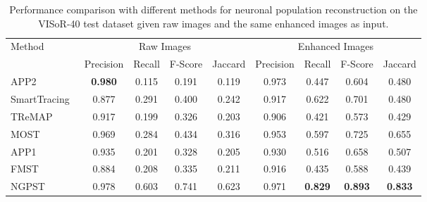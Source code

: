 \begin{table}[t]
	\centering
	\caption{Performance comparison with different methods for neuronal population reconstruction on the VISoR-40 test dataset given raw images and the same enhanced images as input.}
	\label{table:compare_VISoR}
	\begin{tabular}{lcccc|cccc}
		\hline
		\multirow{2}{*}{Method} & \multicolumn{4}{c|}{Raw Images}  & \multicolumn{4}{c}{Enhanced Images}\\ 
		\cline{2-5} \cline{6-9}
		& Precision & Recall & F-Score & Jaccard & Precision & Recall & F-Score & Jaccard\\ 
		\hline
		\multicolumn{1}{l}{APP2~\cite{Xiao2013}} & \textbf{0.980} & 0.115 & 0.191 & 0.119 & 0.973 & 0.447 & 0.604 & 0.480\\
		\multicolumn{1}{l}{SmartTracing~\cite{Chen2015}} & 0.877 & 0.291 & 0.400 & 0.242 & 0.917 & 0.622 & 0.701 & 0.480\\
		\multicolumn{1}{l}{TReMAP~\cite{Zhou2016}} & 0.917 & 0.199 & 0.326 & 0.203 & 0.906 & 0.421 & 0.573 & 0.429\\
		\multicolumn{1}{l}{MOST~\cite{Wu2014} } & 0.969 & 0.284& 0.434& 0.316 & 0.953 & 0.597 & 0.725 & 0.655\\
		\multicolumn{1}{l}{APP1~\cite{Peng2011}} & 0.935 & 0.201 & 0.328 & 0.205 & 0.930 & 0.516 & 0.658 & 0.507\\
		\multicolumn{1}{l}{FMST~\cite{Yang2019}} & 0.884 & 0.208 & 0.335 &  0.211 & 0.916 & 0.435 & 0.588 &  0.439\\
		\multicolumn{1}{l}{NGPST~\cite{Quan2015}} & 0.978 & 0.603 & 0.741 & 0.623 & 0.971 & \textbf{0.829} & \textbf{0.893} & \textbf{0.833}\\
		\hline
	\end{tabular}
\end{table}



